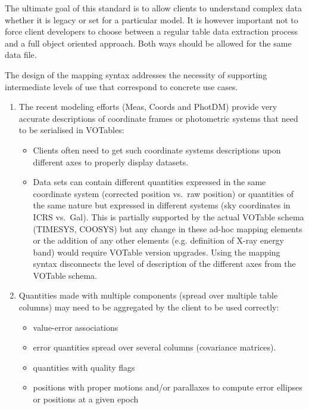 
The ultimate goal of this standard is to allow clients to understand complex data whether it is legacy or set for a particular model. It is however important not to force client developers  to choose between a regular table data extraction process and a full object oriented approach. Both ways should be allowed for the same data file.

The design of the mapping syntax addresses the necessity of supporting intermediate levels of use that correspond to concrete use cases.

\begin{enumerate}
  \item The recent modeling efforts (Meas, Coords and PhotDM) provide very accurate descriptions of coordinate frames or photometric 
        systems that need to be serialised in VOTables:
  \begin{itemize}
    \item Clients often need to get such coordinate systems descriptions upon different axes to properly display datasets. 
    \item Data sets can contain different quantities expressed in the
    same coordinate system (corrected position vs.~raw position) or 
          quantities of the same nature but expressed in different
          systems (sky coordinates in ICRS vs.~Gal). 
          This is partially supported by the actual VOTable schema (TIMESYS, COOSYS) but any change in these ad-hoc mapping 
          elements or the addition of any other elements (e.g. definition of X-ray energy band) would require VOTable version upgrades. 
          Using the mapping syntax disconnects the level of description of the different axes from the VOTable schema.           
  \end{itemize} 
  
  \item Quantities made with multiple components (spread over multiple table columns) may need to be aggregated by the client to be used correctly:
  \begin{itemize}
    \item value-error associations
    \item error quantities spread over several columns (covariance matrices). 
    \item quantities with quality flags
    \item positions with proper motions and/or parallaxes to compute error ellipses or positions at a given epoch
  \end{itemize} 


\end{enumerate}
